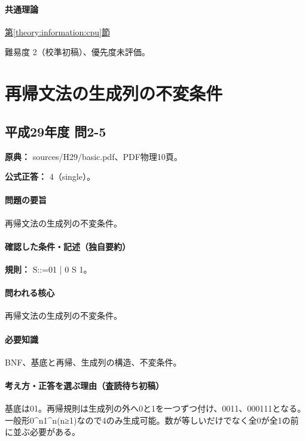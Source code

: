 \paragraph{共通理論} \hyperref[theory:information:cpu]{第\ref*{theory:information:cpu}節}

\par 難易度 2（校準初稿）、優先度未評価。

\section{再帰文法の生成列の不変条件}

\subsection{平成29年度 問2-5}
\label{q:h29-reg-basic-2-5}

\noindent\textbf{原典：} sources/H29/basic.pdf、PDF物理10頁。

\textbf{公式正答：} 4（single）。

\paragraph{問題の要旨} 再帰文法の生成列の不変条件。

\paragraph{確認した条件・記述（独自要約）}\mbox{}\par

\noindent\textbf{規則：} S::=01 | 0 S 1。\par

\paragraph{問われる核心} 再帰文法の生成列の不変条件。

\paragraph{必要知識} BNF、基底と再帰、生成列の構造、不変条件。

\paragraph{考え方・正答を選ぶ理由（査読待ち初稿）} 基底は01。再帰規則は生成列の外へ0と1を一つずつ付け、0011、000111となる。一般形0\textasciicircum{}n1\textasciicircum{}n(n≥1)なので4のみ生成可能。数が等しいだけでなく全0が全1の前に並ぶ必要がある。

